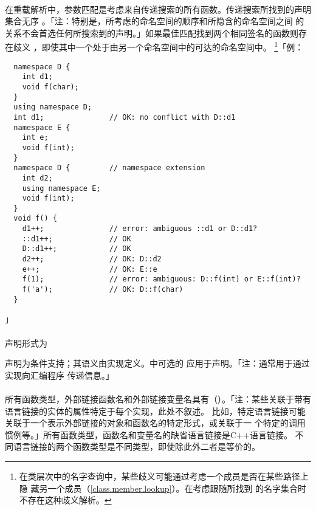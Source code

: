\paragraph{}
在重载解析中，参数匹配是考虑来自传递搜索的所有函数。传递搜索所找到的声明集合无序
。「注：特别是，所考虑的命名空间的顺序和所隐含的命名空间之间
的关系不会首选任何所搜索到的声明。」如果最佳匹配找到两个相同签名的函数则存在歧义
，即使其中一个处于由另一个命名空间中的可达的命名空间中。
\footnote{在类层次中的名字查询中，某些歧义可能通过考虑一个成员是否在某些路径上隐
藏另一个成员（\ref{class.member.lookup}）。在考虑跟随所找到
的名字集合时不存在这种歧义解析。}「例：
\begin{lstlisting}
  namespace D {
    int d1;
    void f(char);
  }
  using namespace D;
  int d1;               // OK: no conflict with D::d1
  namespace E {
    int e;
    void f(int);
  }
  namespace D {         // namespace extension
    int d2;
    using namespace E;
    void f(int);
  }
  void f() {
    d1++;               // error: ambiguous ::d1 or D::d1?
    ::d1++;             // OK
    D::d1++;            // OK
    d2++;               // OK: D::d2
    e++;                // OK: E::e
    f(1);               // error: ambiguous: D::f(int) or E::f(int)?
    f('a');             // OK: D::f(char)
  }
\end{lstlisting}」

\paragraph{}
声明形式为


声明为条件支持；其语义由实现定义。中可选的
应用于声明。「注：通常用于通过实现向汇编程序
传递信息。」

\paragraph{}
所有函数类型，外部链接函数名和外部链接变量名具有（）。「注：某些关联于带有语言链接的实体的属性特定于每个实现，此处不叙述。
比如，特定语言链接可能关联于一个表示外部链接的对象和函数名的特定形式，或关联于一
个特定的调用惯例等。」所有函数类型，函数名和变量名的缺省语言链接是C++语言链接。
不同语言链接的两个函数类型是不同类型，即使除此外二者是等价的。


